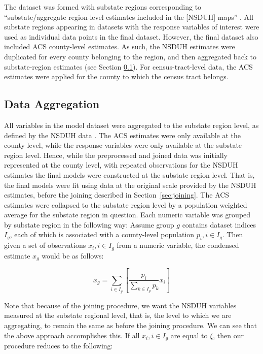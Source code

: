 \documentclass{article}
\begin{document}
The dataset was formed with substate regions corresponding to
``substate/aggregate region-level estimates included in the [NSDUH] maps''
\cite{samhsa_data}. All substate regions appearing in datasets with the response
variables of interest were used as individual data points in the final dataset.
However, the final dataset also included ACS county-level estimates. As such,
the NSDUH estimates were duplicated for every county belonging to the region,
and then aggregated back to substate-region estimates (see Section
\ref{sec:aggregation}).
For census-tract-level data, the ACS estimates
were applied for the county to which the census tract belongs.

\subsection{Data Aggregation}\label{sec:aggregation}

All variables in the model dataset were aggregated to the substate region level,
as defined by the NSDUH data \cite{samhsa_substate_region_defs}.
The ACS estimates were only available at the county level,
while the response variables were only available at the substate region level.
Hence, while the preprocessed and joined data was
initially represented at the county level,
with repeated observations for the NSDUH estimates
the final models were constructed at the substate region level.
That is, the final models were fit using data at the original
scale provided by the NSDUH estimates, before the joining described in
Section~\ref{sec:joining}.
The ACS estimates were collapsed to the substate region level
by a population weighted average for the substate region in question.
Each numeric variable was grouped by substate region
in the following way:
Assume group $g$ contains dataset indices $I_g$,
each of which is associated with a county-level population
$p_{i}, i \in I_g$.
Then given a set of observations $x_{i}, i \in I_g$
from a numeric variable,
the condensed estimate $x_g$ would be as follows:

\begin{equation*}
    x_g = \sum_{i \in I_g}
    \left[ \frac{p_{i}}{\sum_{k \in I_g} p_{k}} x_i \right]
\end{equation*}

Note that because of the joining procedure,
we want the NSDUH variables measured at the substate regional level,
that is, the level to which we are aggregating,
to remain the same as before the joining procedure.
We can see that the above approach accomplishes this.
If all $x_i, i \in I_g$ are equal to $\xi$,
then our procedure reduces to the following:
\end{document}
